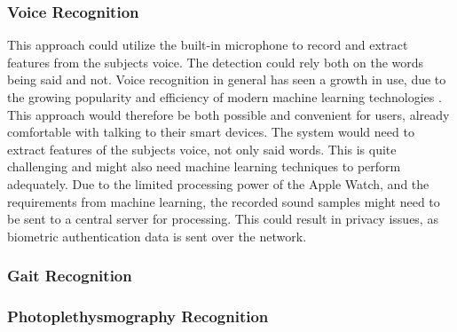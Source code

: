 \subsubsection{Voice Recognition}
This approach could utilize the built-in microphone to record and extract
features from the subjects voice. The detection could rely both on the words
being said and not. Voice recognition in general has seen a growth in use, due
to the growing popularity and efficiency of modern machine learning
technologies \cite{6296526}. This approach would therefore be both possible and
convenient for users, already comfortable with talking to their smart devices. 
The system would need to extract features of the subjects voice, not only said
words. This is quite challenging and might also need machine learning techniques to
perform adequately. Due to the limited processing power of the Apple Watch, and
the requirements from machine learning, the recorded sound samples might need to
be sent to a central server for processing. This could result in privacy issues,
as biometric authentication data is sent over the network.

\subsubsection{Gait Recognition}

\subsubsection{Photoplethysmography Recognition}

